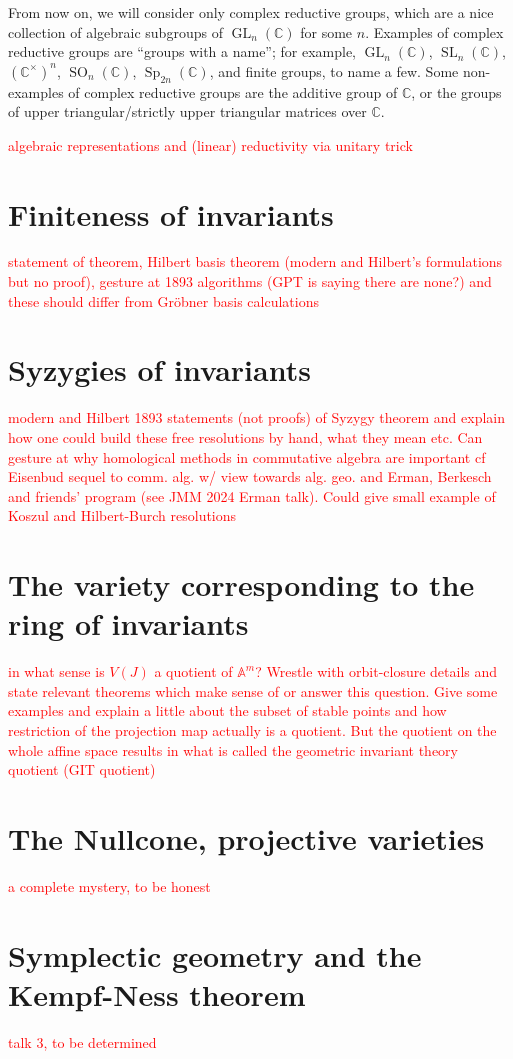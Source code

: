 \documentclass[11pt,leqno]{article}
\newcommand{\sai}[1]{\textcolor{red}{#1}}
\theoremstyle{plain}
\theoremstyle{definition}
\numberwithin{equation}{section}
\numberwithin{lem}{section}
\DeclareMathOperator{\GL}{GL}
\DeclareMathOperator{\SL}{SL}
\DeclareMathOperator{\SO}{SO}
\DeclareMathOperator{\Sp}{Sp}
\begin{document}
From now on, we will consider only complex reductive groups, which are a nice collection of algebraic subgroups of $\GL_n(\mathbb C)$ for some $n$. Examples of complex reductive groups are ``groups with a name''; for example, $\GL_n(\mathbb C)$, $\SL_n(\mathbb C)$, $(\mathbb C^\times)^n$, $\SO_n(\mathbb C)$, $\Sp_{2n}(\mathbb C)$, and finite groups, to name a few. Some non-examples of complex reductive groups are the additive group of $\mathbb C$, or the groups of upper triangular/strictly upper triangular matrices over $\mathbb C$.

\sai{algebraic representations and (linear) reductivity via unitary trick}

\section{Finiteness of invariants}
\sai{statement of theorem, Hilbert basis theorem (modern and Hilbert's formulations but no proof), gesture at 1893 algorithms (GPT is saying there are none?) and these should differ from Gr\"obner basis calculations}

\section{Syzygies of invariants}
\sai{modern and Hilbert 1893 statements (not proofs) of Syzygy theorem and explain how one could build these free resolutions by hand, what they mean etc. Can gesture at why homological methods in commutative algebra are important cf Eisenbud sequel to comm. alg. w/ view towards alg. geo. and Erman, Berkesch and friends' program (see JMM 2024 Erman talk). Could give small example of Koszul and Hilbert-Burch resolutions}

\section{The variety corresponding to the ring of invariants}
\sai{in what sense is $V(J)$ a quotient of $\mathbb A^m$? Wrestle with orbit-closure details and state relevant theorems which make sense of or answer this question. Give some examples and explain a little about the subset of stable points and how restriction of the projection map actually is a quotient. But the quotient on the whole affine space results in what is called the geometric invariant theory quotient (GIT quotient)}

\section{The Nullcone, projective varieties}
\sai{a complete mystery, to be honest}

\section{Symplectic geometry and the Kempf-Ness theorem}
\sai{talk 3, to be determined}
\end{document}
